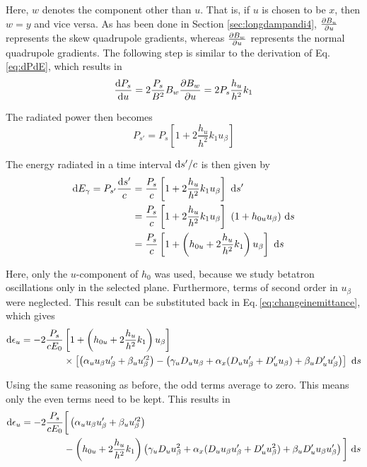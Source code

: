 Here, $w$ denotes the component other than $u$. That is, if $u$ is chosen to be $x$, then $w = y$ and vice versa. As has been done in Section \ref{sec:longdampandi4}, $\frac{\partial {B_u}}{\partial {u}}$ represents the skew quadrupole gradients, whereas $\frac{\partial {B_w}}{\partial {u}}$ represents the normal quadrupole gradients. The following step is similar to the derivation of Eq.\,\ref{eq:dPdE}, which results in
\begin{equation}
    \frac{\text{d} {P_s}}{\text{d} {u}} = 2 \frac{P_s}{B^2} B_w \frac{\partial {B_w}}{\partial {u}} = 2 P_s \frac{h_u}{h^2} k_1
\end{equation}

The radiated power then becomes
\begin{equation}
    P_{s'} = P_s \left[ 1 + 2 \frac{h_u}{h^2} k_1 u_\beta \right]
\end{equation}

The energy radiated in a time interval $\text{d} s' / c$ is then given by
\begin{align}
    \text{d} E_\gamma = P_{s'} \frac{\text{d} s'}{c} &= \frac{P_s}{c} \left[ 1 + 2 \frac{h_u}{h^2} k_1 u_\beta \right]\ \text{d} s' \notag\\
                                             &= \frac{P_s}{c} \left[ 1 + 2 \frac{h_u}{h^2} k_1 u_\beta \right]\ (1 + h_{0u} u_\beta)\ \text{d} s \notag\\
                                             &= \frac{P_s}{c} \left[ 1 + \left( h_{0u} + 2 \frac{h_u}{h^2} k_1 \right) u_\beta \right]\ \text{d} s
\end{align}

Here, only the $u$-component of $h_0$ was used, because we study betatron oscillations only in the selected plane. Furthermore, terms of second order in $u_\beta$ were neglected. This result can be substituted back in Eq.\,\ref{eq:changeinemittance}, which gives
\begin{align}
    \dee \epsilon_u = - 2 \frac{P_s}{cE_0} &\left[ 1 + \left( h_{0u} + 2 \frac{h_u}{h^2} k_1 \right) u_\beta \right]  \notag \\
                    & \times \left[ \left( \alpha_u u_\beta u_\beta' + \beta_u u_\beta'^2 \right)  - \left( \gamma_u D_u u_\beta + \alpha_x (D_u u_\beta' + D_u' u_\beta) + \beta_u D_u' u_\beta' \right)\right] \ \dee s
\end{align}

Using the same reasoning as before, the odd terms average to zero. This means only the even terms need to be kept. This results in
\begin{align}
    \text{d} \epsilon_u = - 2 \frac{P_s}{cE_0} &\bigg[ \left( \alpha_u u_\beta u_\beta' + \beta_u u_\beta'^2 \right) \notag\\
    &- \left( h_{0u} + 2 \frac{h_u}{h^2} k_1 \right) \left( \gamma_u D_u u_\beta^2 + \alpha_x (D_u u_\beta u_\beta' + D_u' u_\beta^2) + \beta_u D_u' u_\beta u_\beta' \right) \bigg]\ \text{d} s
\end{align}

